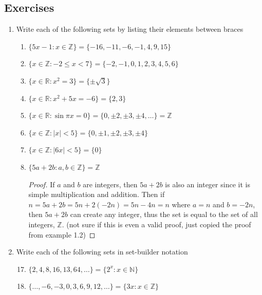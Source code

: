\documentclass[10pt]{article}
\newcommand{\R}{\mathbb{R}}
\newcommand{\N}{\mathbb{N}}
\newcommand{\Z}{\mathbb{Z}}
\theoremstyle{definition}
\begin{document}
\subsection*{Exercises}
\begin{enumerate}[label=\Alph*.]
    \item Write each of the following sets by listing their elements between braces
        \begin{enumerate}[label=\arabic*.]
            \item $\{5x-1: x\in\Z\} = \{-16, -11, -6, -1, 4, 9, 15\}$
            \item $\{x \in \Z : -2\leq x < 7\} = \{-2, -1, 0, 1,2,3,4,5,6\}$
            \item $\{x \in \R : x^2 = 3\} = \{\pm\sqrt{3}\}$
            \item $\{x \in \R : x^2+5x=-6\}=\{2,3\}$
            \item $\{x\in\R : \sin{\pi x} = 0\}=\{0,\pm2,\pm3,\pm4,\dots\}=\Z$
            \item $\{x \in \Z : |x|<5\}=\{0,\pm1,\pm2,\pm3,\pm4\}$
            \item $\{x\in\Z:|6x|<5\}=\{0\}$
            \item $\{5a+2b:a,b\in\Z\}=\Z$
                \begin{proof}
                    If $a$ and $b$ are integers, then $5a+2b$ is also an integer since it is simple multiplication and addition. Then if $n = 5a+2b = 5n+2(-2n) = 5n -4n = n$ where $a = n$ and $b = -2n$, then $5a+2b$ can create any integer, thus the set is equal to the set of all integers, $\Z$. (not sure if this is even a valid proof, just copied the proof from example 1.2)
                \end{proof}
        \end{enumerate}
    \item Write each of the following sets in set-builder notation
        \begin{enumerate}[label=\arabic*.]
                \setcounter{enumii}{16}
            \item $\{2,4,8,16,13,64,\dots\} = \{2^x : x \in \N\}$
            \item $\{\dots, -6,-3,0,3,6,9,12,\dots\} = \{3x: x \in \Z\}$

\end{enumerate}
\end{enumerate}
\end{document}
